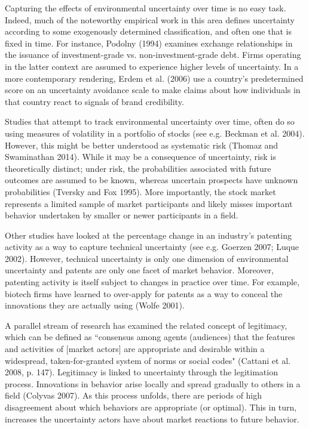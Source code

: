 Capturing the effects of environmental uncertainty over time is no easy task. Indeed, much of the noteworthy empirical work in this area defines uncertainty according to some exogenously determined classification, and often one that is fixed in time. For instance, Podolny (1994) examines exchange relationships in the issuance of investment-grade vs. non-investment-grade debt. Firms operating in the latter context are assumed to experience higher levels of uncertainty. In a more contemporary rendering, Erdem et al. (2006) use a country's predetermined score on an uncertainty avoidance scale to make claims about how individuals in that country react to signals of brand credibility. 

Studies that attempt to track environmental uncertainty over time, often do so using measures of volatility in a portfolio of stocks (see e.g. Beckman et al. 2004). However, this might be better understood as systematic risk (Thomaz and Swaminathan 2014). While it may be a consequence of uncertainty, risk is theoretically distinct; under risk, the probabilities associated with future outcomes are assumed to be known, whereas uncertain prospects have unknown probabilities (Tversky and Fox 1995). More importantly, the stock market represents a limited sample of market participants and likely misses important behavior undertaken by smaller or newer participants in a field. 

Other studies have looked at the percentage change in an industry's patenting activity as a way to capture technical uncertainty (see e.g. Goerzen 2007; Luque 2002). However, technical uncertainty is only one dimension of environmental uncertainty and patents are only one facet of market behavior. Moreover, patenting activity is itself subject to changes in practice over time. For example, biotech firms have learned to over-apply for patents as a way to conceal the innovations they are actually using (Wolfe 2001).

A parallel stream of research has examined the related concept of legitimacy, which can be defined as ``consensus among agents (audiences) that the features and activities of [market actors] are appropriate and desirable within a widespread, taken-for-granted system of norms or social codes" (Cattani et al. 2008, p. 147). Legitimacy is linked to uncertainty through the legitimation process. Innovations in behavior arise locally and spread gradually to others in a field (Colyvas 2007). As this process unfolds, there are periods of high disagreement about which behaviors are appropriate (or optimal). This in turn, increases the uncertainty actors have about market reactions to future behavior.

